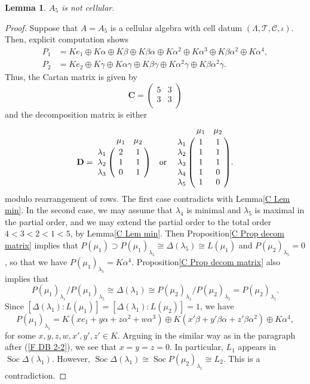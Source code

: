\documentclass[12pt]{amsart}
\newtheorem{lem}[thm]{Lemma}
\numberwithin{equation}{thm}
\newcommand\bC{\mathbf C}
\newcommand\bD{\mathbf D}
\newcommand\cC{\mathcal{C}}
\newcommand\cT{\mathcal{T}}
\newcommand\la{\lambda}
\newcommand\D{\Delta}
\newcommand\Soc{\operatorname{Soc}}
\newcounter{ni}
\begin{document}
{\begin{lem}
\label{P A5}
$A_5$ is not cellular.
\end{lem}
\begin{proof}
Suppose that $A=A_5$ is a cellular algebra with cell datum $(\Lambda,\cT,\cC,\iota)$. Then, 
explicit computation shows
\begin{align*}
P_1 &=
Ke_1\oplus K\alpha\oplus K\beta\oplus K\beta\alpha\oplus K\alpha^2\oplus K\alpha^3
\oplus K\beta\alpha^2\oplus K\alpha^4, \\ 
P_2 &=
Ke_2\oplus K\gamma\oplus K\alpha\gamma\oplus K\beta\gamma\oplus K\alpha^2\gamma\oplus K\beta\alpha^2\gamma.
\end{align*}
Thus, the Cartan matrix is given by
\[
\bC=\begin{pmatrix}5& 3 \\3 & 3\\\end{pmatrix}
\]
and the decomposition matrix is either
 \[
\bD=\bordermatrix{
& \mu_1 & \mu_2 \cr
\lambda_1 & 2 & 1 \cr
\lambda_2 & 1 & 1 \cr
\lambda_3 & 0 & 1 \cr
}
\quad \text{or}\quad
\bordermatrix{
& \mu_1 & \mu_2 \cr
\lambda_1 & 1 & 1 \cr
\lambda_2 & 1 & 1 \cr
\lambda_3 & 1 & 1 \cr
\lambda_4 & 1 & 0 \cr
\lambda_5 & 1 & 0 \cr
}. 
\] 
modulo rearrangement of rows. 
The first case contradicts with Lemma\;\ref{C Lem min}. In the second case,
we may assume that $\la_4$ is minimal and 
$\la_5$ is maximal in the partial order, and we may extend the partial order to the total order 
$4<3<2<1<5$, by Lemma\;\ref{C Lem min}.
Then Proposition\;\ref{C Prop decom matrix} implies that
$P(\mu_1)\supset P(\mu_1)_{\lambda_5}\cong \D(\lambda_5)\cong L(\mu_1)$ and $P(\mu_2)_{\lambda_5}=0$, 
so that we have $P(\mu_1)_{\lambda_5}=K \alpha^4$. Proposition\;\ref{C Prop decom matrix} 
also implies that 
\[P(\mu_1)_{\lambda_1}/P(\mu_1)_{\lambda_5}\cong \D(\lambda_1)
\cong P(\mu_2)_{\lambda_1}/P(\mu_2)_{\lambda_5}=P(\mu_2)_{\lambda_1}.\]
Since $[\D(\lambda_1):L(\mu_1)]=[\D(\lambda_1):L(\mu_2)]=1$, we have
\[P(\mu_1)_{\lambda_1}=
K(xe_1+y\alpha+z\alpha^2+w\alpha^3)
\oplus K(x'\beta+y'\beta\alpha+z'\beta\alpha^2)\oplus K\alpha^4,\]
for some $x,y,z,w,x',y',z'\in K$.
Arguing in the similar way as in the paragraph after (\ref{F DB 2-2}), we see
that $x=y=z=0$. In particular, $L_1$ appears in $\Soc \D(\lambda_1)$.
However, $\Soc \D(\lambda_1)\cong \Soc P(\mu_2)_{\lambda_1}\cong L_2$. This is a contradiction.
\end{proof}


}
\end{document}

